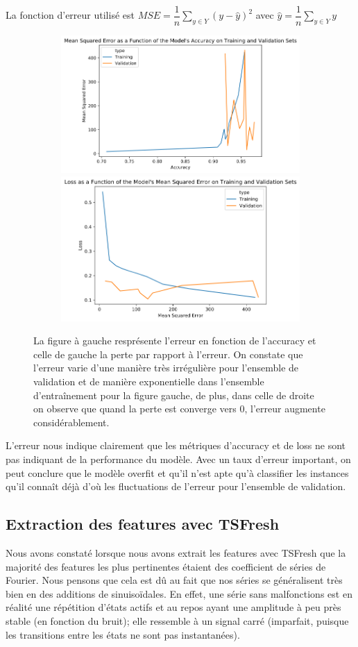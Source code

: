 \documentclass[french]{article}
\theoremstyle{mytheoremstyle}
\theoremstyle{mytheoremstyle}
\theoremstyle{myproblemstyle}
\begin{document}
    La fonction d'erreur utilisé est $MSE = \dfrac{1}{n}\sum\limits_{y \in Y} (y - \hat{y})^2$ avec $\hat{y}=\dfrac{1}{n}\sum\limits_{y \in Y} y$
    \begin{figure}[H]
        \centering
        \begin{subfigure}{\linewidth}
            \includegraphics[width=.49\textwidth]{images/cnn_mse_acc.png}
            \hfill
            \includegraphics[width=.47\textwidth]{images/cnn_loss_mse.png}
        \end{subfigure}
        \caption{La figure à gauche resprésente l'erreur en fonction de l'accuracy et celle de gauche la perte par rapport à l'erreur. On constate que l'erreur varie d'une manière très irrégulière pour l'ensemble de validation et de manière exponentielle dans l'ensemble d'entraînement pour la figure gauche, de plus, dans celle de droite on observe que quand la perte est converge vers 0, l'erreur augmente considérablement.}
        \label{}
    \end{figure}
    L'erreur nous indique clairement que les métriques d'accuracy et de loss ne sont pas indiquant de la performance du modèle. Avec un taux d'erreur important, on peut conclure que le modèle overfit et qu'il n'est apte qu'à classifier les instances qu'il connaît déjà d'où les fluctuations de l'erreur pour l'ensemble de validation.
    
    \subsection{Extraction des features avec TSFresh}

      Nous avons constaté lorsque nous avons extrait les features avec TSFresh que la majorité des features les plus pertinentes étaient des coefficient de séries de Fourier.
        Nous pensons que cela est dû au fait que nos séries se généralisent très bien en des additions de sinuisoïdales. En effet, une série sans malfonctions est en réalité une répétition d'états actifs et au repos ayant une amplitude à peu près stable (en fonction du bruit); elle ressemble à un signal carré (imparfait, puisque les transitions entre les états ne sont pas instantanées).
        
\end{document}
